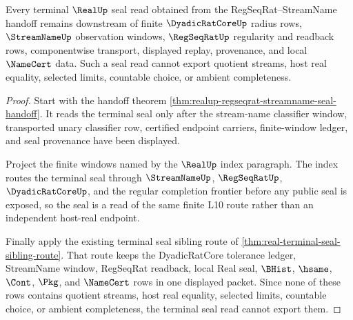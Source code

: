 \begin{theorem}
\label{thm:realup-finite-window-terminal-seal-nonescape}
Every terminal $\RealUp$ seal read obtained from the RegSeqRat--StreamName handoff remains downstream of finite $\DyadicRatCoreUp$ radius rows, $\StreamNameUp$ observation windows, $\RegSeqRatUp$ regularity and readback rows, componentwise transport, displayed replay, provenance, and local $\NameCert$ data. Such a seal read cannot export quotient streams, host real equality, selected limits, countable choice, or ambient completeness.
\end{theorem}
\begin{proof}
Start with the handoff theorem \autoref{thm:realup-regseqrat-streamname-seal-handoff}. It reads the terminal seal only after the stream-name classifier window, transported unary classifier row, certified endpoint carriers, finite-window ledger, and seal provenance have been displayed.

Project the finite windows named by the $\RealUp$ index paragraph. The index routes the terminal seal through $\StreamNameUp$, $\RegSeqRatUp$, $\DyadicRatCoreUp$, and the regular completion frontier before any public seal is exposed, so the seal is a read of the same finite L10 route rather than an independent host-real endpoint.

Finally apply the existing terminal seal sibling route of \autoref{thm:real-terminal-seal-sibling-route}. That route keeps the DyadicRatCore tolerance ledger, StreamName window, RegSeqRat readback, local Real seal, $\BHist$, $\hsame$, $\Cont$, $\Pkg$, and $\NameCert$ rows in one displayed packet. Since none of these rows contains quotient streams, host real equality, selected limits, countable choice, or ambient completeness, the terminal seal read cannot export them.
\end{proof}
